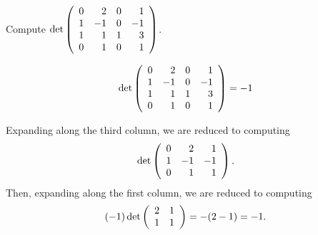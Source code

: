 \documentclass{ximera}
\author{Matthew Carr}
\begin{document}

\begin{exercise}\label{mc.exercise8a}

Compute \quad $\det\left(\begin{array}{rrrrrrrrrrrrrrrrrr} 0 & 2 & 0 & 1\\ 1 & -1 & 0 & -1\\ 1 & 1 & 1& 3\\ 0 & 1 & 0 & 1 \end{array}\right)$.
  
\begin{solution}

\ans \[\det\left(\begin{array}{rrrrrrrrrrrrrrrrrr} 0 & 2 & 0 & 1\\ 1 & -1 & 0 & -1\\ 1 & 1 & 1& 3\\ 0 & 1 & 0 & 1 \end{array}\right)=-1\]

\soln Expanding along the third column, we are reduced to computing 
\[
\det\left(\begin{array}{rrrrrrrrrrrrrrrrrr} 0 & 2 & 1 \\ 1 & -1 & -1\\ 0 & 1 &  1 \end{array}\right)\ldotp
\]
Then, expanding along the first column, we are reduced to computing 
\[
(-1) \det \left(\begin{array}{rrrrrrrrrrrrrrrrrr} 2 & 1 \\ 1 & 1 \end{array}\right)=-(2-1)=-1\ldotp
\]
\end{solution}
\end{exercise}
\end{document}
